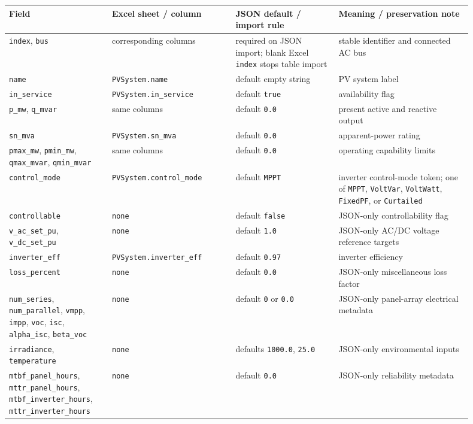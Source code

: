\begin{longtable}{L{0.20\linewidth}L{0.24\linewidth}L{0.20\linewidth}L{0.26\linewidth}}
\toprule
Field & Excel sheet / column & JSON default / import rule & Meaning / preservation note \\
\midrule
\endhead
\texttt{index}, \texttt{bus} & corresponding columns & required on JSON import; blank Excel \texttt{index} stops table import & stable identifier and connected AC bus \\
\texttt{name} & \texttt{PVSystem.name} & default empty string & PV system label \\
\texttt{in\_service} & \texttt{PVSystem.in\_service} & default \texttt{true} & availability flag \\
\texttt{p\_mw}, \texttt{q\_mvar} & same columns & default \texttt{0.0} & present active and reactive output \\
\texttt{sn\_mva} & \texttt{PVSystem.sn\_mva} & default \texttt{0.0} & apparent-power rating \\
\texttt{pmax\_mw}, \texttt{pmin\_mw}, \texttt{qmax\_mvar}, \texttt{qmin\_mvar} & same columns & default \texttt{0.0} & operating capability limits \\
\texttt{control\_mode} & \texttt{PVSystem.control\_mode} & default \texttt{MPPT} & inverter control-mode token; one of \texttt{MPPT}, \texttt{VoltVar}, \texttt{VoltWatt}, \texttt{FixedPF}, or \texttt{Curtailed} \\
\texttt{controllable} & \texttt{none} & default \texttt{false} & JSON-only controllability flag \\
\texttt{v\_ac\_set\_pu}, \texttt{v\_dc\_set\_pu} & \texttt{none} & default \texttt{1.0} & JSON-only AC/DC voltage reference targets \\
\texttt{inverter\_eff} & \texttt{PVSystem.inverter\_eff} & default \texttt{0.97} & inverter efficiency \\
\texttt{loss\_percent} & \texttt{none} & default \texttt{0.0} & JSON-only miscellaneous loss factor \\
\texttt{num\_series}, \texttt{num\_parallel}, \texttt{vmpp}, \texttt{impp}, \texttt{voc}, \texttt{isc}, \texttt{alpha\_isc}, \texttt{beta\_voc} & \texttt{none} & default \texttt{0} or \texttt{0.0} & JSON-only panel-array electrical metadata \\
\texttt{irradiance}, \texttt{temperature} & \texttt{none} & defaults \texttt{1000.0}, \texttt{25.0} & JSON-only environmental inputs \\
\texttt{mtbf\_panel\_hours}, \texttt{mttr\_panel\_hours}, \texttt{mtbf\_inverter\_hours}, \texttt{mttr\_inverter\_hours} & \texttt{none} & default \texttt{0.0} & JSON-only reliability metadata \\
\bottomrule
\end{longtable}

